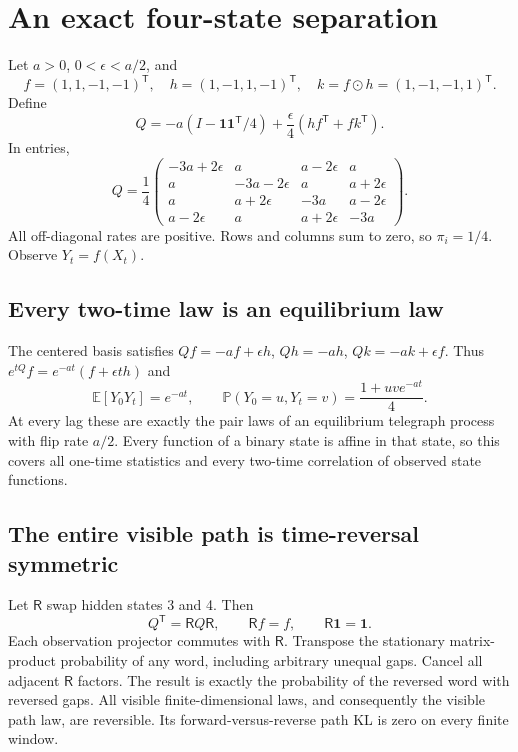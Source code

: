 \documentclass[11pt,a4paper]{article}
\newcommand{\E}{\mathbb E}\newcommand{\Prb}{\mathbb P}
\newcommand{\one}{\mathbf 1}\newcommand{\KL}{D_{\mathrm{KL}}}
\begin{document}
\section{An exact four-state separation}
Let $a>0$, $0<\epsilon<a/2$, and
\[
f=(1,1,-1,-1)^{\mathsf T},\quad h=(1,-1,1,-1)^{\mathsf T},\quad
k=f\odot h=(1,-1,-1,1)^{\mathsf T}.
\]
Define
\begin{equation}\label{eq:Q}
Q=-a(I-\one\one^{\mathsf T}/4)+\frac\epsilon4(hf^{\mathsf T}+fk^{\mathsf T}).
\end{equation}
In entries,
\[Q=\frac14\begin{pmatrix}
-3a+2\epsilon&a&a-2\epsilon&a\\
a&-3a-2\epsilon&a&a+2\epsilon\\
a&a+2\epsilon&-3a&a-2\epsilon\\
a-2\epsilon&a&a+2\epsilon&-3a
\end{pmatrix}.\]
All off-diagonal rates are positive. Rows and columns sum to zero, so $\pi_i=1/4$. Observe $Y_t=f(X_t)$.
\subsection{Every two-time law is an equilibrium law}
The centered basis satisfies $Qf=-af+\epsilon h$, $Qh=-ah$, $Qk=-ak+\epsilon f$. Thus $e^{tQ}f=e^{-at}(f+\epsilon th)$ and
\begin{equation}\label{eq:pair}
\E[Y_0Y_t]=e^{-at},\qquad\Prb(Y_0=u,Y_t=v)=\frac{1+uv e^{-at}}4.
\end{equation}
At every lag these are exactly the pair laws of an equilibrium telegraph process with flip rate $a/2$. Every function of a binary state is affine in that state, so this covers all one-time statistics and every two-time correlation of observed state functions.

\subsection{The entire visible path is time-reversal symmetric}
Let $\mathsf R$ swap hidden states 3 and 4. Then
\[
Q^{\mathsf T}=\mathsf RQ\mathsf R,\qquad\mathsf Rf=f,\qquad\mathsf R\one=\one.
\]
Each observation projector commutes with $\mathsf R$. Transpose the stationary matrix-product probability of any word, including arbitrary unequal gaps. Cancel all adjacent $\mathsf R$ factors. The result is exactly the probability of the reversed word with reversed gaps. All visible finite-dimensional laws, and consequently the visible path law, are reversible. Its forward-versus-reverse path KL is zero on every finite window.
\end{document}
